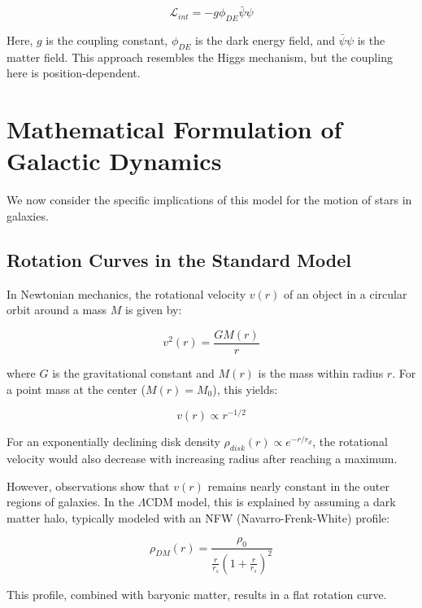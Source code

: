 \documentclass[a4paper,12pt]{article}
\begin{document}
	\begin{equation}
		\mathcal{L}_{int} = -g \phi_{DE} \bar{\psi}\psi
	\end{equation}
	
	Here, $g$ is the coupling constant, $\phi_{DE}$ is the dark energy field, and $\bar{\psi}\psi$ is the matter field. This approach resembles the Higgs mechanism, but the coupling here is position-dependent.\\
	
	\section{Mathematical Formulation of Galactic Dynamics}
	
	We now consider the specific implications of this model for the motion of stars in galaxies.
	
	\subsection{Rotation Curves in the Standard Model}
	
	In Newtonian mechanics, the rotational velocity $v(r)$ of an object in a circular orbit around a mass $M$ is given by:
	
	\begin{equation}
		v^2(r) = \frac{GM(r)}{r}
	\end{equation}
	
	where $G$ is the gravitational constant and $M(r)$ is the mass within radius $r$. For a point mass at the center ($M(r) = M_0$), this yields:
	
	\begin{equation}
		v(r) \propto r^{-1/2}
	\end{equation}
	
	For an exponentially declining disk density $\rho_{disk}(r) \propto e^{-r/r_d}$, the rotational velocity would also decrease with increasing radius after reaching a maximum.
	
	However, observations show that $v(r)$ remains nearly constant in the outer regions of galaxies. In the $\Lambda$CDM model, this is explained by assuming a dark matter halo, typically modeled with an NFW (Navarro-Frenk-White) profile:
	
	\begin{equation}
		\rho_{DM}(r) = \frac{\rho_0}{\frac{r}{r_s}\left(1 + \frac{r}{r_s}\right)^2}
	\end{equation}
	
	This profile, combined with baryonic matter, results in a flat rotation curve.
	
\end{document}

